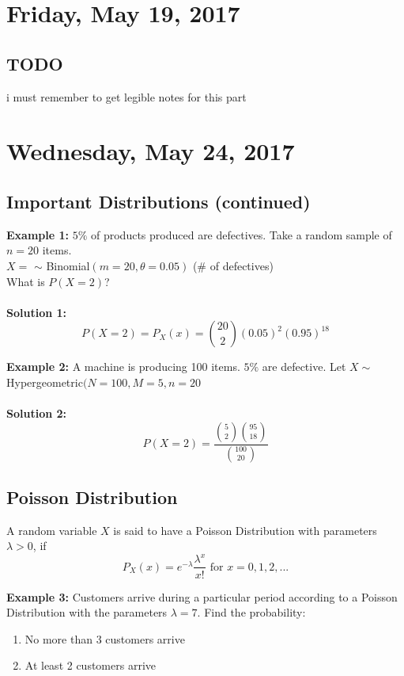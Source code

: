 \documentclass[12pt]{article}
\begin{document}
\section{Friday, May 19, 2017}

\subsection{TODO}
i must remember to get legible notes for this part

\newpage

\section{Wednesday, May 24, 2017}

\subsection{Important Distributions (continued)}

\textbf{Example 1:} $5\%$ of products produced are defectives. Take a random sample of $n = 20$ items.\\
$X = $ $\sim$ Binomial$(m = 20, \theta = 0.05)$  (\# of defectives)\\
What is $P(X = 2)$?\\
\\
\textbf{Solution 1:} $$P(X = 2) = P_X (x) = \binom{20}{2} (0.05)^2 (0.95)^{18}$$

\textbf{Example 2:} A machine is producing 100 items. $5\%$ are defective. Let $X \sim $ Hypergeometric$(N = 100, M = 5, n = 20$\\
\\
\textbf{Solution 2:} $$P(X = 2) = \frac{\binom{5}{2} \binom{95}{18}}{ \binom{100}{20}}$$

\subsection{Poisson Distribution}

\begin{tcolorbox}[title=Definition: Poisson Distribution]
	A random variable $X$ is said to have a Poisson Distribution with parameters $\lambda > 0$, if
	$$P_X (x) = e^{-\lambda} \frac{\lambda^x}{x!} \text{ for } x = 0,1,2,...$$
\end{tcolorbox}

\textbf{Example 3:} Customers arrive during a particular period according to a Poisson Distribution with the parameters $\lambda = 7$. Find the probability:
\begin{enumerate}
	\item{No more than 3 customers arrive}
	\item{At least 2 customers arrive}
\end{enumerate}
\end{document}
